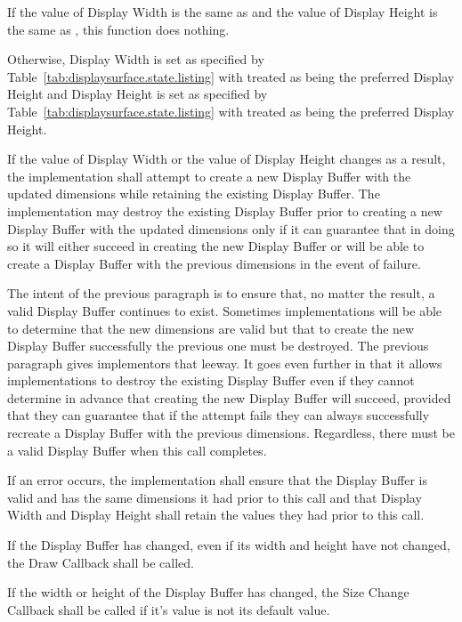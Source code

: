\begin{itemdescr}
\pnum
\effects
If the value of Display Width is the same as  and the value of Display Height is the same as , this function does nothing.

\pnum
Otherwise, Display Width is set as specified by Table~\ref{tab:displaysurface.state.listing} with  treated as being the preferred Display Height and Display Height is set as specified by Table~\ref{tab:displaysurface.state.listing} with  treated as being the preferred Display Height.

\pnum
If the value of Display Width or the value of Display Height changes as a result, the implementation shall attempt to create a new Display Buffer with the updated dimensions while retaining the existing Display Buffer. The implementation may destroy the existing Display Buffer prior to creating a new Display Buffer with the updated dimensions only if it can guarantee that in doing so it will either succeed in creating the new Display Buffer or will be able to create a Display Buffer with the previous dimensions in the event of failure.

\pnum
\begin{note}
The intent of the previous paragraph is to ensure that, no matter the result, a valid Display Buffer continues to exist. Sometimes implementations will be able to determine that the new dimensions are valid but that to create the new Display Buffer successfully the previous one must be destroyed. The previous paragraph gives implementors that leeway. It goes even further in that it allows implementations to destroy the existing Display Buffer even if they cannot determine in advance that creating the new Display Buffer will succeed, provided that they can guarantee that if the attempt fails they can always successfully recreate a Display Buffer with the previous dimensions. Regardless, there must be a valid Display Buffer when this call completes.
\end{note}

\pnum
If an error occurs, the implementation shall ensure that the Display Buffer is valid and has the same dimensions it had prior to this call and that Display Width and Display Height shall retain the values they had prior to this call.

\pnum
If the Display Buffer has changed, even if its width and height have not changed, the Draw Callback shall be called.

\pnum
If the width or height of the Display Buffer has changed, the Size Change Callback shall be called if it's value is not its default value.


\end{itemdescr}
